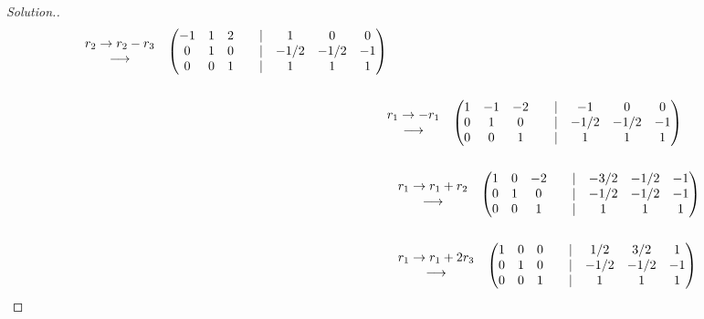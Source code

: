 \documentclass[11pt,a4paper]{article}
\theoremstyle{definition}
\newenvironment{solution}
  {\renewcommand{\qedsymbol}{}\begin{proof}[\textit{Solution}.]}
  {\end{proof}}
\begin{document}
\begin{solution}
\begin{align*}
\begin{matrix}
r_2\rightarrow r_2-r_3\\ \longrightarrow\\
\end{matrix}
\hspace{0.3cm}
\begin{pmatrix}
-1&1&2&&|&1&0&0\\0&1&0&&|&-1/2&-1/2&-1\\0&0&1&&|&1&1&1\\
\end{pmatrix}\\\\
\hspace{0.3cm}&
\begin{matrix}
r_1\rightarrow -r_1\\ \longrightarrow\\
\end{matrix}
\hspace{0.3cm}
\begin{pmatrix}
1&-1&-2&&|&-1&0&0\\0&1&0&&|&-1/2&-1/2&-1\\0&0&1&&|&1&1&1\\
\end{pmatrix}\\\\
&\hspace{0.3cm}
\begin{matrix}
r_1\rightarrow r_1+r_2\\ \longrightarrow\\
\end{matrix}
\hspace{0.3cm}
\begin{pmatrix}
1&0&-2&&|&-3/2&-1/2&-1\\0&1&0&&|&-1/2&-1/2&-1\\0&0&1&&|&1&1&1\\
\end{pmatrix}\\\\
&\hspace{0.3cm}
\begin{matrix}
r_1\rightarrow r_1+2r_3\\ \longrightarrow\\
\end{matrix}
\hspace{0.3cm}
\begin{pmatrix}
1&0&0&&|&1/2&3/2&1\\0&1&0&&|&-1/2&-1/2&-1\\0&0&1&&|&1&1&1\\
\end{pmatrix}\\
\end{align*}



\end{solution}
\end{document}
